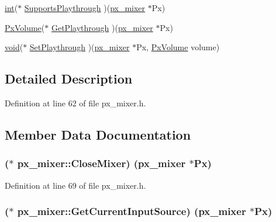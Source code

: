 \begin{DoxyCompactItemize}
\item 
\hyperlink{xmltok_8h_a5a0d4a5641ce434f1d23533f2b2e6653}{int}($\ast$ \hyperlink{structpx__mixer_a9e2fc3cb31ed8cfabbb19599cb400eb1}{Supports\+Playthrough} )(\hyperlink{structpx__mixer}{px\+\_\+mixer} $\ast$Px)
\item 
\hyperlink{portmixer_8h_a9353e1a36e40ffe275fbea0105e39dad}{Px\+Volume}($\ast$ \hyperlink{structpx__mixer_a25362265d1607b75ec6a3b0da6fac694}{Get\+Playthrough} )(\hyperlink{structpx__mixer}{px\+\_\+mixer} $\ast$Px)
\item 
\hyperlink{sound_8c_ae35f5844602719cf66324f4de2a658b3}{void}($\ast$ \hyperlink{structpx__mixer_aa4632364a5928af13f0dda569dcd05b4}{Set\+Playthrough} )(\hyperlink{structpx__mixer}{px\+\_\+mixer} $\ast$Px, \hyperlink{portmixer_8h_a9353e1a36e40ffe275fbea0105e39dad}{Px\+Volume} volume)
\end{DoxyCompactItemize}


\subsection{Detailed Description}


Definition at line 62 of file px\+\_\+mixer.\+h.



\subsection{Member Data Documentation}
\subsubsection[{\texorpdfstring{Close\+Mixer}{CloseMixer}}]{($\ast$ px\+\_\+mixer\+::\+Close\+Mixer) ({\bf px\+\_\+mixer} $\ast$Px)}\hypertarget{structpx__mixer_a3102e9061c74070f2e3f6151c819913a}{}\label{structpx__mixer_a3102e9061c74070f2e3f6151c819913a}


Definition at line 69 of file px\+\_\+mixer.\+h.

\subsubsection[{\texorpdfstring{Get\+Current\+Input\+Source}{GetCurrentInputSource}}]{($\ast$ px\+\_\+mixer\+::\+Get\+Current\+Input\+Source) ({\bf px\+\_\+mixer} $\ast$Px)}\hypertarget{structpx__mixer_a66a47bfc2b37c16f0c3cd6be2bbfc38b}{}\label{structpx__mixer_a66a47bfc2b37c16f0c3cd6be2bbfc38b}


